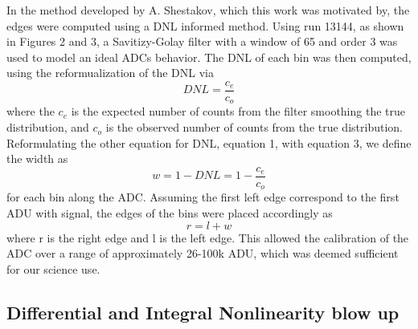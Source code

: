 \documentclass[11pt, letterpaper]{article}
\begin{document}
In the method developed by A. Shestakov, which this work was motivated by, the edges were computed using a DNL informed method. 
Using run 13144, as shown in Figures 2 and 3, a Savitizy-Golay filter with a window of 65 and order 3 was used to model an ideal ADCs behavior. 
The DNL of each bin was then computed, using the reformualization of the DNL via 
 \begin{equation}\label{}
 DNL = \frac{c_e}{c_o}
 \end{equation}
where the $c_{e}$ is the expected number of counts from the filter smoothing the true distribution, and $c_{o}$ is the observed number of counts from the true distribution. 
Reformulating the other equation for DNL, equation 1, with equation 3, we define the width as
 \begin{equation}\label{}
 w = 1-DNL = 1- \frac{c_e}{c_o}
 \end{equation}
for each bin along the ADC. 
Assuming the first left edge correspond to the first ADU with signal, the edges of the bins were placed accordingly as
 \begin{equation}\label{}
r = l + w 
\end{equation}
where r is the right edge and l is the left edge. 
This allowed the calibration of the ADC over a range of approximately 26-100k ADU, which was deemed sufficient for our science use. 


\subsection{Differential and Integral Nonlinearity blow up}
\indent
\end{document}
